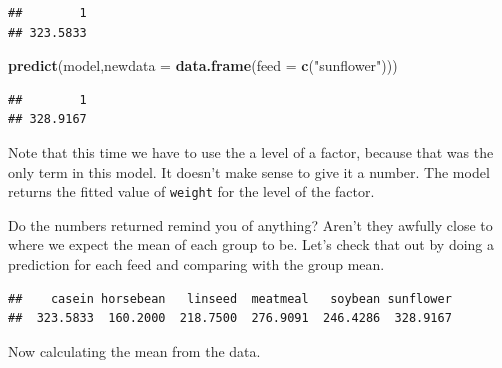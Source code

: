 \documentclass[
]{book}
\newenvironment{Shaded}{\begin{snugshade}}{\end{snugshade}}
\newcommand{\CommentTok}[1]{\textcolor[rgb]{0.56,0.35,0.01}{\textit{#1}}}
\newcommand{\DataTypeTok}[1]{\textcolor[rgb]{0.13,0.29,0.53}{#1}}
\newcommand{\KeywordTok}[1]{\textcolor[rgb]{0.13,0.29,0.53}{\textbf{#1}}}
\newcommand{\NormalTok}[1]{#1}
\newcommand{\OperatorTok}[1]{\textcolor[rgb]{0.81,0.36,0.00}{\textbf{#1}}}
\newcommand{\StringTok}[1]{\textcolor[rgb]{0.31,0.60,0.02}{#1}}
\begin{document}
\begin{verbatim}
##        1 
## 323.5833
\end{verbatim}

\begin{Shaded}
\begin{Highlighting}[]
\KeywordTok{predict}\NormalTok{(model,}\DataTypeTok{newdata =} \KeywordTok{data.frame}\NormalTok{(}\DataTypeTok{feed =} \KeywordTok{c}\NormalTok{(}\StringTok{"sunflower"}\NormalTok{)))}
\end{Highlighting}
\end{Shaded}

\begin{verbatim}
##        1 
## 328.9167
\end{verbatim}

Note that this time we have to use the a level of a factor, because that was the only term in this model. It doesn't make sense to give it a number. The model returns the fitted value of \texttt{weight} for the level of the factor.

Do the numbers returned remind you of anything? Aren't they awfully close to where we expect the mean of each group to be. Let's check that out by doing a prediction for each feed and comparing with the group mean.

\begin{Shaded}
\end{Shaded}

\begin{verbatim}
##    casein horsebean   linseed  meatmeal   soybean sunflower 
##  323.5833  160.2000  218.7500  276.9091  246.4286  328.9167
\end{verbatim}

Now calculating the mean from the data.

\begin{Shaded}
\end{Shaded}
\end{document}
